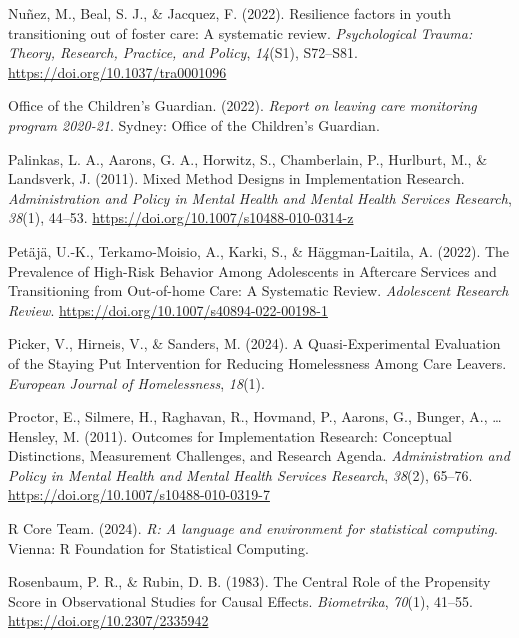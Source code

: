 \documentclass[
  jou,
  floatsintext,
  longtable,
  nolmodern,
  notxfonts,
  notimes,
  colorlinks=true,linkcolor=blue,citecolor=blue,urlcolor=blue]{apa7}
\newlength{\cslhangindent}
\newenvironment{CSLReferences}[2] %
 {\begin{list}{}{%
  \setlength{\itemindent}{0pt}
  \setlength{\leftmargin}{0pt}
  \setlength{\parsep}{0pt}
  \ifodd #1
   \setlength{\leftmargin}{\cslhangindent}
   \setlength{\itemindent}{-1\cslhangindent}
  \fi
  \setlength{\itemsep}{#2\baselineskip}}}
 {\end{list}}
\begin{document}
\begin{CSLReferences}{1}{0}
Nuñez, M., Beal, S. J., \& Jacquez, F. (2022). Resilience factors in
youth transitioning out of foster care: {A} systematic review.
\emph{Psychological Trauma: Theory, Research, Practice, and Policy},
\emph{14}(S1), S72--S81. \url{https://doi.org/10.1037/tra0001096}

Office of the Children's Guardian. (2022). \emph{Report on leaving care
monitoring program 2020-21}. Sydney: Office of the Children's Guardian.

Palinkas, L. A., Aarons, G. A., Horwitz, S., Chamberlain, P., Hurlburt,
M., \& Landsverk, J. (2011). Mixed {Method Designs} in {Implementation
Research}. \emph{Administration and Policy in Mental Health and Mental
Health Services Research}, \emph{38}(1), 44--53.
\url{https://doi.org/10.1007/s10488-010-0314-z}

Petäjä, U.-K., Terkamo-Moisio, A., Karki, S., \& Häggman-Laitila, A.
(2022). The {Prevalence} of {High-Risk Behavior Among Adolescents} in
{Aftercare Services} and {Transitioning} from {Out-of-home Care}: {A
Systematic Review}. \emph{Adolescent Research Review}.
\url{https://doi.org/10.1007/s40894-022-00198-1}

Picker, V., Hirneis, V., \& Sanders, M. (2024). A {Quasi-Experimental
Evaluation} of the {Staying Put Intervention} for {Reducing Homelessness
Among Care Leavers}. \emph{European Journal of Homelessness},
\emph{18}(1).

Proctor, E., Silmere, H., Raghavan, R., Hovmand, P., Aarons, G., Bunger,
A., \ldots{} Hensley, M. (2011). Outcomes for {Implementation Research}:
{Conceptual Distinctions}, {Measurement Challenges}, and {Research
Agenda}. \emph{Administration and Policy in Mental Health and Mental
Health Services Research}, \emph{38}(2), 65--76.
\url{https://doi.org/10.1007/s10488-010-0319-7}

R Core Team. (2024). \emph{R: {A} language and environment for
statistical computing}. Vienna: R Foundation for Statistical Computing.

Rosenbaum, P. R., \& Rubin, D. B. (1983). The {Central Role} of the
{Propensity Score} in {Observational Studies} for {Causal Effects}.
\emph{Biometrika}, \emph{70}(1), 41--55.
\url{https://doi.org/10.2307/2335942}


\end{CSLReferences}
\end{document}
